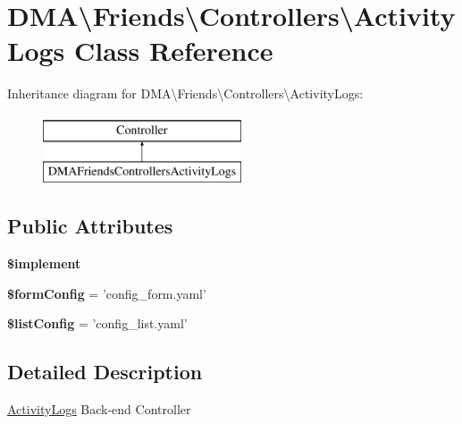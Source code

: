 \hypertarget{classDMA_1_1Friends_1_1Controllers_1_1ActivityLogs}{\section{D\+M\+A\textbackslash{}Friends\textbackslash{}Controllers\textbackslash{}Activity\+Logs Class Reference}
\label{classDMA_1_1Friends_1_1Controllers_1_1ActivityLogs}
}
Inheritance diagram for D\+M\+A\textbackslash{}Friends\textbackslash{}Controllers\textbackslash{}Activity\+Logs\+:\begin{figure}[H]
\begin{center}
\leavevmode
\includegraphics[height=2.000000cm]{d4/d23/classDMA_1_1Friends_1_1Controllers_1_1ActivityLogs}
\end{center}
\end{figure}
\subsection*{Public Attributes}
\begin{DoxyCompactItemize}
\item 
{\bfseries \$implement}
\item 
\hypertarget{classDMA_1_1Friends_1_1Controllers_1_1ActivityLogs_a2b07b2999d34d646303a3d70ade2da0a}{{\bfseries \$form\+Config} = 'config\+\_\+form.\+yaml'}\label{classDMA_1_1Friends_1_1Controllers_1_1ActivityLogs_a2b07b2999d34d646303a3d70ade2da0a}

\item 
\hypertarget{classDMA_1_1Friends_1_1Controllers_1_1ActivityLogs_a4f2d381656dbf1241a60f5b404a6230b}{{\bfseries \$list\+Config} = 'config\+\_\+list.\+yaml'}\label{classDMA_1_1Friends_1_1Controllers_1_1ActivityLogs_a4f2d381656dbf1241a60f5b404a6230b}

\end{DoxyCompactItemize}


\subsection{Detailed Description}
\hyperlink{classDMA_1_1Friends_1_1Controllers_1_1ActivityLogs}{Activity\+Logs} Back-\/end Controller 


